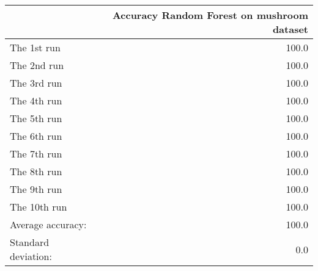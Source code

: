 \begin{tabular}{lr}
\toprule
{} &  Accuracy Random Forest on mushroom dataset \\
\midrule
The 1st run         &                                       100.0 \\
The 2nd run         &                                       100.0 \\
The 3rd run         &                                       100.0 \\
The 4th run         &                                       100.0 \\
The 5th run         &                                       100.0 \\
The 6th run         &                                       100.0 \\
The 7th run         &                                       100.0 \\
The 8th run         &                                       100.0 \\
The 9th run         &                                       100.0 \\
The 10th run        &                                       100.0 \\
Average accuracy:   &                                       100.0 \\
Standard deviation: &                                         0.0 \\
\bottomrule
\end{tabular}
